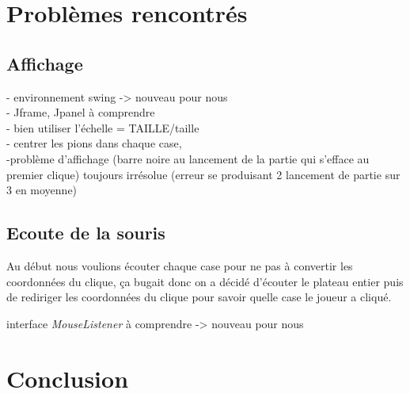\documentclass[12,french]{report}
\begin{document}
\chapter{Problèmes rencontrés}

\section{Affichage}

- environnement swing -> nouveau pour nous\\

- Jframe, Jpanel à comprendre\\

- bien utiliser l'échelle = TAILLE/taille\\

- centrer les pions dans chaque case, \\

-problème d'affichage (barre noire au lancement de la partie qui s'efface au premier clique) toujours irrésolue (erreur se produisant 2 lancement de partie sur 3 en moyenne)\\
 
\section{Ecoute de la souris}

Au début nous voulions écouter chaque case pour ne pas à convertir les coordonnées du clique, ça bugait donc on a décidé d'écouter le plateau entier puis de rediriger les coordonnées du clique pour savoir quelle case le joueur a cliqué.

interface \textit{MouseListener} à comprendre -> nouveau pour nous


\chapter*{Conclusion}
\end{document}
